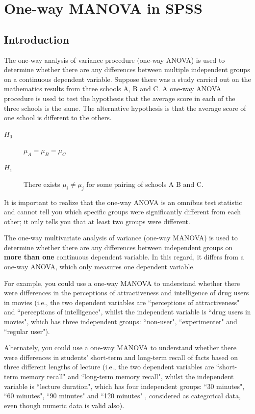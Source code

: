 \documentclass[a4paper,12pt]{article}
\begin{document}
	
	\tableofcontents
	\newpage


\section{One-way MANOVA in SPSS}

\subsection{Introduction}
The one-way analysis of variance procedure (one-way ANOVA) is used to determine whether there are any differences between multiple independent groups on a continuous dependent variable. Suppose there was a study carried out on the mathematics results from three schools A, B and C. A one-way ANOVA procedure is used to test the hypothesis that the average score in each of the three schools is the same.
The alternative hypothesis is that the average score of one school is different to the others.
\begin{description}
\item[$H_0$] $\mu_A = \mu_B = \mu_C$
\item[$H_1$] There exists $\mu_i \neq \mu_j$ for some pairing of schools A B and C.
\end{description}
It is important to realize that the one-way ANOVA is an omnibus test statistic and cannot tell you which specific groups were significantly different from each other; it only tells you that at least two groups were different.

The one-way multivariate analysis of variance (one-way MANOVA) is used to determine whether there are any differences between independent groups on \textbf{more than one} continuous dependent variable. In this regard, it differs from a one-way ANOVA, which only measures one dependent variable.


For example, you could use a one-way MANOVA to understand whether there were differences in the perceptions of attractiveness and intelligence of drug users in movies (i.e., the two dependent variables are ``perceptions of attractiveness" and ``perceptions of intelligence", whilst the independent variable is ``drug users in movies", which has three independent groups: ``non-user", ``experimenter" and ``regular user").


Alternately, you could use a one-way MANOVA to understand whether there were differences in students' short-term and long-term recall of facts based on three different lengths of lecture (i.e., the two dependent variables are ``short-term memory recall" and ``long-term memory recall", whilst the independent variable is ``lecture duration", which has four independent groups: ``30 minutes", ``60 minutes", ``90 minutes" and ``120 minutes" , considered as categorical data, even though numeric data is valid also).
\end{document}
